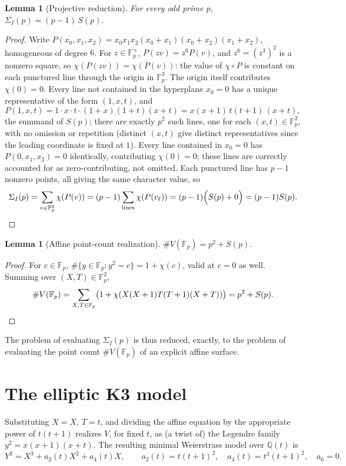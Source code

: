 \documentclass[11pt]{amsart}
\newtheorem{lemma}[theorem]{Lemma}
\theoremstyle{definition}
\newcommand{\Fp}{\mathbb{F}_p}
\newcommand{\Q}{\mathbb{Q}}
\begin{document}
\begin{lemma}[Projective reduction]
\label{lem:sigmaI}
For every odd prime $p$, $\Sigma_I(p)=(p-1)\,S(p)$.
\end{lemma}

\begin{proof}
Write $P(x_0,x_1,x_2)=x_0x_1x_2(x_0+x_1)(x_0+x_2)(x_1+x_2)$, homogeneous of degree $6$. For $z\in\Fp^\times$, $P(zv)=z^6P(v)$, and $z^6=(z^3)^2$ is a nonzero square, so $\chi(P(zv))=\chi(P(v))$: the value of $\chi\circ P$ is constant on each punctured line through the origin in $\Fp^3$. The origin itself contributes $\chi(0)=0$. Every line not contained in the hyperplane $x_0=0$ has a unique representative of the form $(1,x,t)$, and
\[
P(1,x,t)=1\cdot x\cdot t\cdot(1+x)(1+t)(x+t)=x(x+1)\,t(t+1)\,(x+t),
\]
the summand of $S(p)$; there are exactly $p^2$ such lines, one for each $(x,t)\in\Fp^2$, with no omission or repetition (distinct $(x,t)$ give distinct representatives since the leading coordinate is fixed at $1$). Every line contained in $x_0=0$ has $P(0,x_1,x_2)=0$ identically, contributing $\chi(0)=0$; these lines are correctly accounted for as zero-contributing, not omitted. Each punctured line has $p-1$ nonzero points, all giving the same character value, so
\[
\Sigma_I(p)=\sum_{v\in\Fp^3}\chi(P(v)) = (p-1)\sum_{\text{lines}}\chi(P(v_\ell)) = (p-1)\Bigl(S(p)+0\Bigr)=(p-1)S(p).\qedhere
\]
\end{proof}

\begin{lemma}[Affine point-count realization]
\label{lem:V}
$\#V(\Fp)=p^2+S(p)$.
\end{lemma}

\begin{proof}
For $c\in\Fp$, $\#\{y\in\Fp: y^2=c\}=1+\chi(c)$, valid at $c=0$ as well. Summing over $(X,T)\in\Fp^2$,
\[
\#V(\Fp)=\sum_{X,T\in\Fp}\bigl(1+\chi(X(X+1)T(T+1)(X+T))\bigr)=p^2+S(p).\qedhere
\]
\end{proof}

The problem of evaluating $\Sigma_I(p)$ is thus reduced, exactly, to the problem of evaluating the point count $\#V(\Fp)$ of an explicit affine surface.

\section{The elliptic K3 model}
\label{sec:K3}

Substituting $X=X$, $T=t$, and dividing the affine equation by the appropriate power of $t(t+1)$ realizes $V$, for fixed $t$, as (a twist of) the Legendre family $y^2=x(x+1)(x+t)$. The resulting minimal Weierstrass model over $\Q(t)$ is
\[
Y^2 = X^3 + a_2(t)X^2+a_4(t)X,\qquad a_2(t)=t(t+1)^2,\quad a_4(t)=t^3(t+1)^2,\quad a_6=0.
\]
\end{document}
